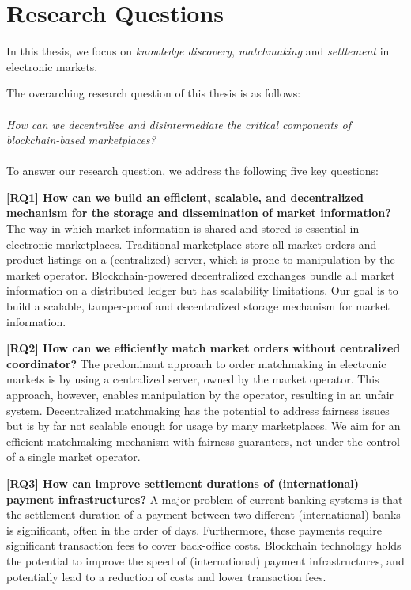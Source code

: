\section{Research Questions}
\label{sec:research_questions}
In this thesis, we focus on \emph{knowledge discovery}, \emph{matchmaking} and \emph{settlement} in electronic markets.

The overarching research question of this thesis is as follows:\\\\
\emph{How can we decentralize and disintermediate the critical components of blockchain-based marketplaces?}\\\\
To answer our research question, we address the following five key questions:

\textbf{[RQ1] How can we build an efficient, scalable, and decentralized mechanism for the storage and dissemination of market information?}
The way in which market information is shared and stored is essential in electronic marketplaces.
Traditional marketplace store all market orders and product listings on a (centralized) server, which is prone to manipulation by the market operator.
Blockchain-powered decentralized exchanges bundle all market information on a distributed ledger but has scalability limitations.
Our goal is to build a scalable, tamper-proof and decentralized storage mechanism for market information.

\textbf{[RQ2] How can we efficiently match market orders without centralized coordinator?}
The predominant approach to order matchmaking in electronic markets is by using a centralized server, owned by the market operator.
This approach, however, enables manipulation by the operator, resulting in an unfair system.
Decentralized matchmaking has the potential to address fairness issues but is by far not scalable enough for usage by many marketplaces.
We aim for an efficient matchmaking mechanism with fairness guarantees, not under the control of a single market operator.

\textbf{[RQ3] How can improve settlement durations of (international) payment infrastructures?}
A major problem of current banking systems is that the settlement duration of a payment between two different (international) banks is significant, often in the order of days.
Furthermore, these payments require significant transaction fees to cover back-office costs.
Blockchain technology holds the potential to improve the speed of (international) payment infrastructures, and potentially lead to a reduction of costs and lower transaction fees.

